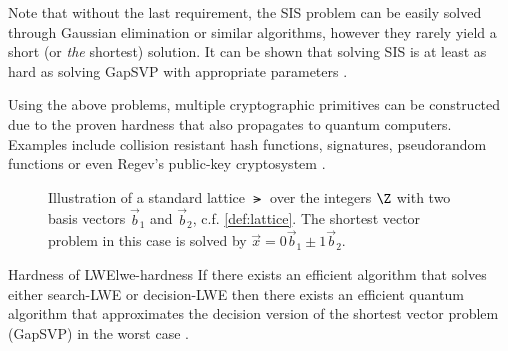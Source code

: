Note that without the last requirement, the SIS problem can be easily solved through Gaussian elimination or
similar algorithms, however they rarely yield a short (or \textit{the} shortest) solution.
It can be shown that solving SIS is at least as hard as solving GapSVP with appropriate parameters
\parencite{1996-hard-lattice-problems}.

Using the above problems, multiple cryptographic primitives can be constructed
due to the proven hardness that also propagates to quantum computers.
Examples include collision resistant hash functions, signatures, pseudorandom functions
or even Regev's public-key cryptosystem \parencite{2016-decade-of-lattice}.

\usetikzlibrary{calc}
\begin{figure}
  \centering
  \caption{Illustration of a standard lattice $\lat$ over the integers $\Z$
    with two basis vectors $\vec{b}_1$ and $\vec{b}_2$, c.f. \autoref{def:lattice}.
    The shortest vector problem in this case is solved by $\vec{x} = 0 \vec{b}_1 \pm 1 \vec{b}_2$.}
  \label{fig:lattice}
\end{figure}

\begin{theorem}{Hardness of LWE}{lwe-hardness}
  If there exists an efficient algorithm that solves either search-LWE or decision-LWE then
  there exists an efficient quantum algorithm that approximates the decision
  version of the shortest vector problem (GapSVP) in the worst case \parencite{2010-lwe-survey}.
\end{theorem}

